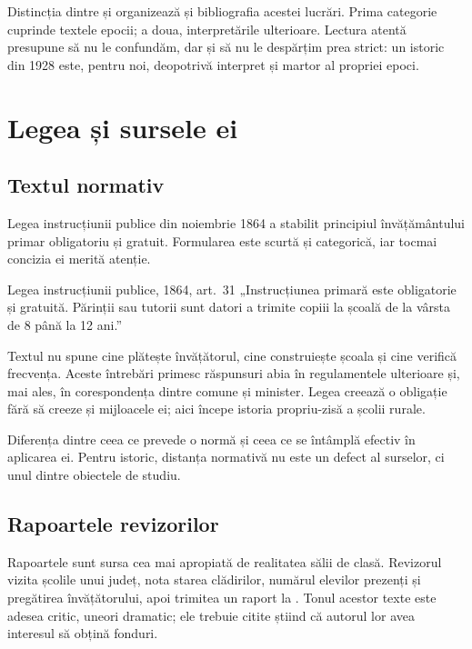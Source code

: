 \documentclass{texign-article}
\begin{document}
Distincția dintre  și  organizează și bibliografia acestei lucrări. Prima categorie cuprinde textele epocii; a doua, interpretările ulterioare. Lectura atentă presupune să nu le confundăm, dar și să nu le despărțim prea strict: un istoric din 1928 este, pentru noi, deopotrivă interpret și martor al propriei epoci.

\section{Legea și sursele ei}\label{sec:lege}

\subsection{Textul normativ}

Legea instrucțiunii publice din noiembrie 1864 a stabilit principiul învățământului primar obligatoriu și gratuit.\cite[art.~31]{lege1864} Formularea este scurtă și categorică, iar tocmai concizia ei merită atenție.

\begin{source}{Legea instrucțiunii publice, 1864, art.~31}
„Instrucțiunea primară este obligatorie și gratuită. Părinții sau tutorii sunt datori a trimite copiii la școală de la vârsta de 8 până la 12 ani.”
\end{source}

Textul nu spune cine plătește învățătorul, cine construiește școala și cine verifică frecvența. Aceste întrebări primesc răspunsuri abia în regulamentele ulterioare și, mai ales, în corespondența dintre comune și minister. Legea creează o obligație fără să creeze și mijloacele ei; aici începe istoria propriu-zisă a școlii rurale.\cite[46]{iorga1928}

\begin{concept}
Diferența dintre ceea ce prevede o normă și ceea ce se întâmplă efectiv în aplicarea ei. Pentru istoric, distanța normativă nu este un defect al surselor, ci unul dintre obiectele de studiu.
\end{concept}

\subsection{Rapoartele revizorilor}

Rapoartele  sunt sursa cea mai apropiată de realitatea sălii de clasă. Revizorul vizita școlile unui județ, nota starea clădirilor, numărul elevilor prezenți și pregătirea învățătorului, apoi trimitea un raport la .\cite{raport1872} Tonul acestor texte este adesea critic, uneori dramatic; ele trebuie citite știind că autorul lor avea interesul să obțină fonduri.\cite[Cf.][14]{popescu1929}
\end{document}
